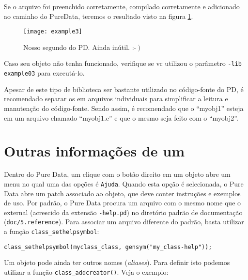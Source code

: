 Se o arquivo foi preenchido corretamente, compilado corretamente e adicionado
ao caminho do PureData, teremos o resultado visto na figura \ref{fig:exemplo3}.

\begin{figure}[h!]
	\centering
	\texttt{[image: example3]}
	\caption{Nosso segundo \external do PD. Ainda inútil. :-$\left.\right)$}
        \label{fig:exemplo3}
\end{figure}

Caso seu objeto não tenha funcionado, verifique se vc utilizou o parâmetro 
\texttt{-lib example03} para executá-lo.


Apesar de este tipo de biblioteca ser bastante utilizado no código-fonte do PD,
é recomendado separar os \external em arquivos individuais para simplificar
a leitura e manutenção do código-fonte.
Sendo assim, é recomendado que o \external ``myobj1'' esteja em um arquivo
chamado ``myobj1.c'' e que o mesmo seja feito com o \external ``myobj2''.

\section{Outras informações de um \external}

Dentro do Pure Data, um clique com o botão direito em um objeto abre um menu
no qual uma das opções é \texttt{Ajuda}. Quando esta opção é selecionada, o
Pure Data abre um patch associado ao objeto, que deve conter instruções e
exemplos de uso. Por padrão, o Pure Data procura um arquivo com o mesmo nome
que o external (acrescido da extensão \texttt{-help.pd}) no diretório padrão de
documentação (\texttt{doc/5.reference}). Para associar um arquivo diferente do
padrão, basta utilizar a função \texttt{class\_sethelpsymbol}:

\vspace{1em}
\begin{lstlisting}[caption=Definição de arquivo de help]
class_sethelpsymbol(myclass_class, gensym("my_class-help"));
\end{lstlisting}

Um objeto pode ainda ter outros nomes (\emph{aliases}). Para definir isto
podemos utilizar a função \texttt{class\_addcreator()}. Veja o exemplo:

